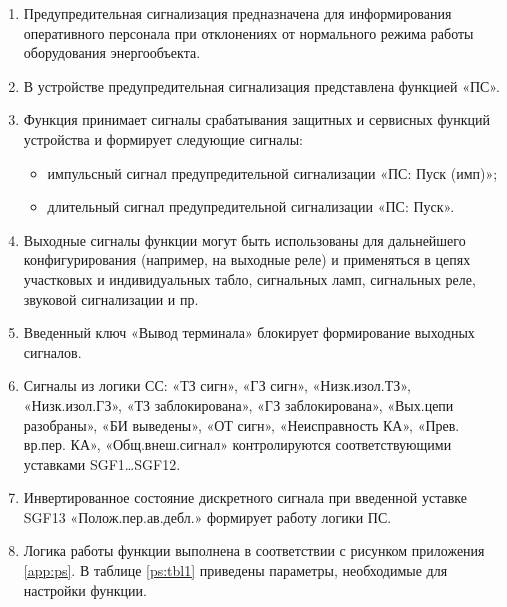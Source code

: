 
\color{black}

\begin{enumerate}

\item	
Предупредительная сигнализация предназначена для информирования оперативного персонала при отклонениях от нормального режима работы оборудования энергообъекта.

\item
В устройстве предупредительная сигнализация представлена функцией «ПС».

\item
Функция принимает сигналы срабатывания защитных и сервисных функций устройства и формирует следующие сигналы:
\begin{itemize}
	\item импульсный сигнал предупредительной сигнализации «ПС: Пуск (имп)»;
	\item длительный сигнал предупредительной сигнализации «ПС: Пуск».
\end{itemize}

\item
Выходные сигналы функции могут быть использованы для дальнейшего конфигурирования (например, на выходные реле) и применяться в цепях участковых и индивидуальных табло, сигнальных ламп, сигнальных реле, звуковой сигнализации и пр.

\item
Введенный ключ «Вывод терминала» блокирует формирование выходных сигналов.

\item
Сигналы из логики СС: «ТЗ сигн», «ГЗ сигн», «Низк.изол.ТЗ», «Низк.изол.ГЗ», «ТЗ заблокирована», «ГЗ заблокирована», «Вых.цепи разобраны», «БИ выведены», «ОТ сигн», «Неисправность КА», «Прев. вр.пер. КА», «Общ.внеш.сигнал» контролируются соответствующими уставками SGF1\ldots SGF12.

\item
Инвертированное состояние дискретного сигнала при введенной уставке SGF13 «Полож.пер.ав.дебл.» формирует работу логики ПС.

\item
Логика работы функции выполнена в соответствии с рисунком приложения \ref{app:ps}. В таблице \ref{ps:tbl1} приведены параметры, необходимые для настройки функции. 

\end{enumerate}
